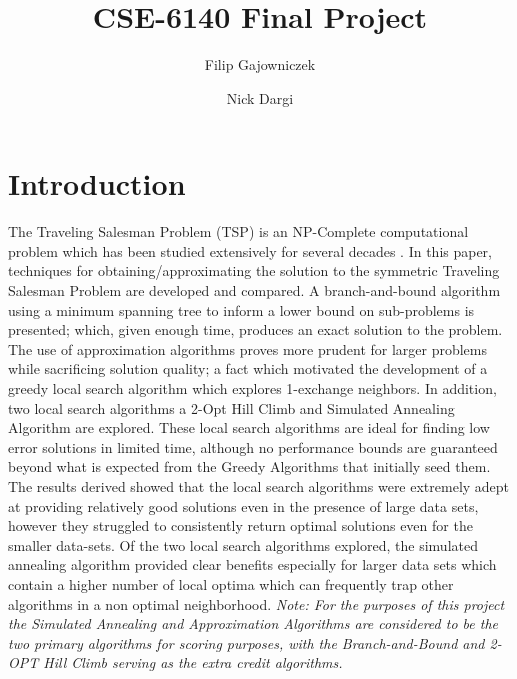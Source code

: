\documentclass[format=sigconf]{acmart}
\begin{document}
\title{CSE-6140 Final Project}
\author{Filip Gajowniczek}
\author{Nick Dargi}


\section{Introduction}
The Traveling Salesman Problem (TSP) is an NP-Complete computational problem which has been studied extensively for several decades \cite{laporte_1992}. In this paper, techniques for obtaining/approximating the solution to the symmetric Traveling Salesman Problem are developed and compared. 
A branch-and-bound algorithm using a minimum spanning tree to inform a lower bound on sub-problems is presented; which, given enough time, produces an exact solution to the problem. The use of approximation algorithms proves more prudent for larger problems while sacrificing solution quality; a fact which motivated the development of a greedy local search algorithm which explores 1-exchange neighbors. 
In addition, two local search algorithms a 2-Opt Hill Climb and Simulated Annealing Algorithm are explored. 
These local search algorithms are ideal for finding low error solutions in limited time, although no performance bounds are guaranteed beyond 
what is expected from the Greedy Algorithms that initially seed them. The results derived showed that the local search algorithms were 
extremely adept at providing relatively good solutions even in the presence of large data sets, however they struggled to consistently return optimal solutions even for the smaller 
data-sets. Of the two local search algorithms explored, the simulated annealing algorithm provided clear benefits especially for larger data sets which contain a higher number of local optima which can frequently trap
 other algorithms in a non optimal neighborhood. \textit{Note: For the purposes of this project the Simulated Annealing 
 and Approximation Algorithms are considered to be the two primary algorithms for scoring purposes, with the Branch-and-Bound and 
 2-OPT Hill Climb serving as the extra credit algorithms.}
\end{document}

